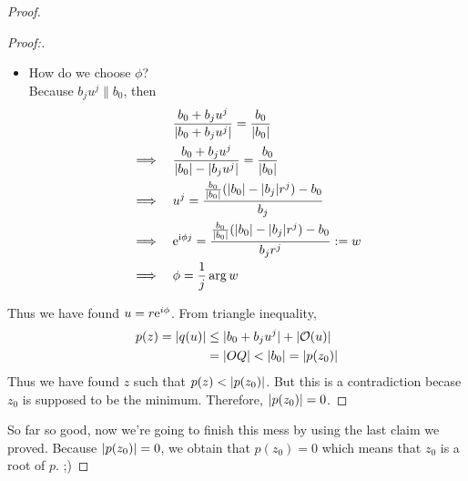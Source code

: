 \begin{proof}
\begin{proof}[Proof:]
\begin{itemize}
      \item How do we choose $\phi$?\\[0.3cm]
        Because $b_ju^j\parallel b_0$,
        then 
        \begin{align*}
          &\frac{b_0+b_ju^j}{\lvert b_0+b_ju^j\rvert}=\frac{b_0}{\lvert b_0\rvert}\\\implies\quad
          &\frac{b_0+b_ju^j}{\lvert b_0\rvert-\lvert b_ju^j\rvert}=\frac{b_0}{\lvert b_0\rvert}\\\implies\quad
          &u^j=\frac{\frac{b_0}{\lvert b_0\rvert}(\lvert b_0\rvert-\lvert b_j\rvert r^j)-b_0}{b_j}\\\implies\quad
          &\mathrm e^{\mathrm i\phi j}=\frac{\frac{b_0}{\lvert b_0\rvert}(\lvert b_0\rvert-\lvert b_j\rvert r^j)-b_0}{b_jr^j}:=w\\\implies\quad
          &\phi=\frac{1}{j}\arg w
        \end{align*}
    \end{itemize}
    Thus we have found $u=r\mathrm e^{i\phi}$. From triangle inequality,
    \begin{align*}
      p(z)=\lvert q(u)\rvert
      &\leq \lvert b_0+b_ju^j\rvert+\lvert\mathcal O(u)\rvert\\
      &=\lvert OQ\rvert<\lvert b_0\rvert=\lvert p(z_0)\rvert
    \end{align*}
    Thus we have found $z$ such that $p(z)<\lvert p(z_0)\rvert$. But this
    is a contradiction becase $z_0$ is supposed to be the minimum.
    Therefore, $\lvert p(z_0)\rvert=0$.
  \end{proof}
  So far so good, now we're going to  finish this mess by using the last
  claim we proved. Because $\lvert p(z_0)\rvert=0$, we obtain that $p(z_0)=0$
  which means that $z_0$ is a root of $p$. ;)
\end{proof}






